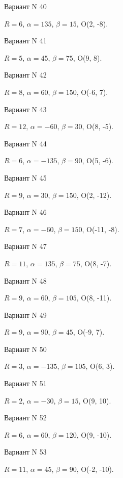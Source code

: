 \documentclass[11pt]{report}
\begin{document}
Вариант N 40

$R = 6$, $\alpha = 135$, $\beta = 15$, O(2, -8).



Вариант N 41

$R = 5$, $\alpha = 45$, $\beta = 75$, O(9, 8).



Вариант N 42

$R = 8$, $\alpha = 60$, $\beta = 150$, O(-6, 7).



Вариант N 43

$R = 12$, $\alpha = -60$, $\beta = 30$, O(8, -5).



Вариант N 44

$R = 6$, $\alpha = -135$, $\beta = 90$, O(5, -6).



Вариант N 45

$R = 9$, $\alpha = 30$, $\beta = 150$, O(2, -12).



Вариант N 46

$R = 7$, $\alpha = -60$, $\beta = 150$, O(-11, -8).



Вариант N 47

$R = 11$, $\alpha = 135$, $\beta = 75$, O(8, -7).



Вариант N 48

$R = 9$, $\alpha = 60$, $\beta = 105$, O(8, -11).



Вариант N 49

$R = 9$, $\alpha = 90$, $\beta = 45$, O(-9, 7).



Вариант N 50

$R = 3$, $\alpha = -135$, $\beta = 105$, O(6, 3).



Вариант N 51

$R = 2$, $\alpha = -30$, $\beta = 15$, O(9, 10).



Вариант N 52

$R = 6$, $\alpha = 60$, $\beta = 120$, O(9, -10).



Вариант N 53

$R = 11$, $\alpha = 45$, $\beta = 90$, O(-2, -10).
\end{document}
